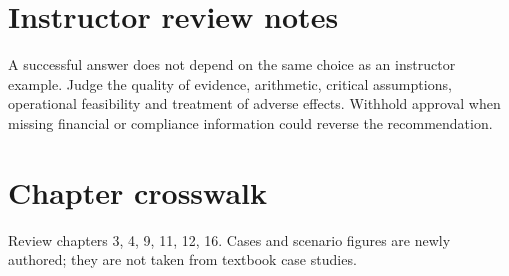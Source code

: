 \documentclass[11pt]{article}
\begin{document}
\section{Instructor review notes}
A successful answer does not depend on the same choice as an instructor example. Judge the quality of evidence, arithmetic, critical assumptions, operational feasibility and treatment of adverse effects. Withhold approval when missing financial or compliance information could reverse the recommendation.
\section{Chapter crosswalk}
Review chapters 3, 4, 9, 11, 12, 16. Cases and scenario figures are newly authored; they are not taken from textbook case studies.
\end{document}
